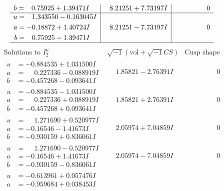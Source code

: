 \documentclass[1p]{elsarticle_modified}
\theoremstyle{definition}
\newcommand{\I}{\sqrt{-1}}
\begin{document}
$$\begin{array}{c|c|c}
\begin{aligned}
b &= \phantom{-}0.75925 + 1.39471 I\end{aligned}
 & \phantom{-}8.21251 + 7.73197 I & \phantom{-0.000000 } 0 \\ \hline\begin{aligned}
u &= \phantom{-}1.343550 - 0.163045 I \\
a &= -0.18872 + 1.40724 I \\
b &= \phantom{-}0.75925 - 1.39471 I\end{aligned}
 & \phantom{-}8.21251 - 7.73197 I & \phantom{-0.000000 } 0\\
 \hline 
 \end{array}$$\newpage$$\begin{array}{c|c|c}  
\text{Solutions to }I^u_{2}& \I (\text{vol} + \sqrt{-1}CS) & \text{Cusp shape}\\
 \hline 
\begin{aligned}
u &= -0.884535 + 1.031500 I \\
a &= \phantom{-}0.227336 - 0.088919 I \\
b &= -0.457268 - 0.093641 I\end{aligned}
 & \phantom{-}1.85821 - 2.76391 I & \phantom{-0.000000 } 0 \\ \hline\begin{aligned}
u &= -0.884535 - 1.031500 I \\
a &= \phantom{-}0.227336 + 0.088919 I \\
b &= -0.457268 + 0.093641 I\end{aligned}
 & \phantom{-}1.85821 + 2.76391 I & \phantom{-0.000000 } 0 \\ \hline\begin{aligned}
u &= \phantom{-}1.271690 + 0.520977 I \\
a &= -0.16546 - 1.41673 I \\
b &= -0.930159 + 0.836061 I\end{aligned}
 & \phantom{-}2.05974 + 7.04859 I & \phantom{-0.000000 } 0 \\ \hline\begin{aligned}
u &= \phantom{-}1.271690 - 0.520977 I \\
a &= -0.16546 + 1.41673 I \\
b &= -0.930159 - 0.836061 I\end{aligned}
 & \phantom{-}2.05974 - 7.04859 I & \phantom{-0.000000 } 0 \\ \hline\begin{aligned}
u &= -0.613961 + 0.057476 I \\
a &= -0.959684 + 0.038453 I \\

\end{aligned}
\end{array}$$
\end{document}
